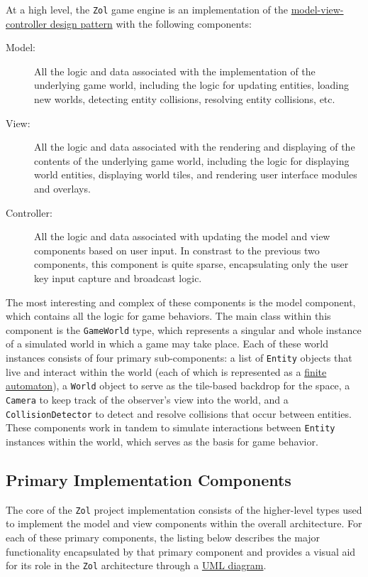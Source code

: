 \documentclass{article}
\newcommand{\classname}[1] {\texttt{#1}}
\newcommand{\projectname}[0] {\texttt{Zol} }
\newcommand{\hreffsm}[1] {\href{http://en.wikipedia.org/wiki/Finite-state\_ machine}{#1}}
\newcommand{\hrefmvc}[1] {\href{http://en.wikipedia.org/wiki/Model\%E2\%80\%93view\%E2\%80\%93controller}{#1}}
\begin{document}
	At a high level, the \projectname game engine is an implementation of the
	\hrefmvc{model-view-controller design pattern} with the following components:

	\begin{description}
		\item[Model:] All the logic and data associated with the implementation
		of the underlying game world, including the logic for updating entities,
		loading new worlds, detecting entity collisions, resolving entity 
		collisions, etc.
		\item[View:] All the logic and data associated with the rendering and displaying
		of the contents of the underlying game world, including the logic for
		displaying world entities, displaying world tiles, and rendering user
		interface modules and overlays.
		\item[Controller:] All the logic and data associated with updating the
		model and view components based on user input.  In constrast to the
		previous two components, this component is quite sparse, encapsulating
		only the user key input capture and broadcast logic.
	\end{description}

	The most interesting and complex of these components is the model component, 
	which contains all the logic for game behaviors.  The main class within this
	component is the \classname{GameWorld} type, which represents a singular and
	whole instance of a simulated world in which a game may take place.  Each
	of these world instances consists of four primary sub-components: a list of
	\classname{Entity} objects that live and interact within the world (each of
	which is represented as a \hreffsm{finite automaton}), a \classname{World}
	object to serve as the tile-based backdrop for the space, a \classname{Camera}
	to keep track of the observer's view into the world, and a
	\classname{CollisionDetector} to detect and resolve collisions that occur
	between entities.  These components work in tandem to simulate interactions
	between \classname{Entity} instances within the world, which serves as the
	basis for game behavior.

		\subsection[Primary Components]{Primary Implementation Components}
		The core of the \projectname project implementation consists of the 
		higher-level types used to implement the model and view components within
		the overall architecture.  For each of these primary components, the listing 
		below describes the major functionality encapsulated by that primary component 
		and provides a visual aid for its role in the \projectname architecture through a 
		\href{http://www.csci.csusb.edu/dick/samples/uml0.html}{UML diagram}.
\end{document}
